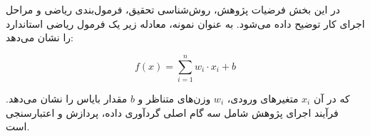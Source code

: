 
در این بخش فرضیات پژوهش، روش‌شناسی تحقیق، فرمول‌بندی ریاضی و مراحل اجرای کار توضیح داده می‌شود. به عنوان نمونه، معادله زیر یک فرمول ریاضی استاندارد را نشان می‌دهد:

\begin{equation}
    f(x) = \sum_{i=1}^{n} w_i \cdot x_i + b
\end{equation}

که در آن $x_i$ متغیرهای ورودی، $w_i$ وزن‌های متناظر و $b$ مقدار بایاس را نشان می‌دهد. فرآیند اجرای پژوهش شامل سه گام اصلی گردآوری داده، پردازش و اعتبارسنجی است.

